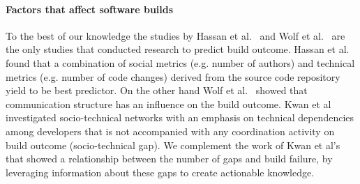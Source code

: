 %
%






\paragraph{Factors that affect software builds}
To the best of our knowledge the studies by Hassan et al.~\cite{hassan:ase:2006}
and Wolf et al.~\cite{wolf:icse:2009} are the only studies that conducted
research to predict build outcome. Hassan et al.~\cite{hassan:ase:2006} found
that a combination of social metrics (e.g. number of authors) and technical
metrics (e.g. number of code changes) derived from the source code repository
yield to be best predictor. 
On the other hand Wolf et al.~\cite{wolf:icse:2009} showed that communication structure has an influence on the build outcome.
Kwan et al~\cite{kwan:tse:2011} investigated socio-technical networks with an emphasis on technical dependencies among developers that is not accompanied with any coordination activity on build outcome (socio-technical gap).
We complement the work of Kwan et al's ~\cite{kwan:tse:2011} that showed a relationship between the number of gaps and build failure, by leveraging information about these gaps to create actionable knowledge.

